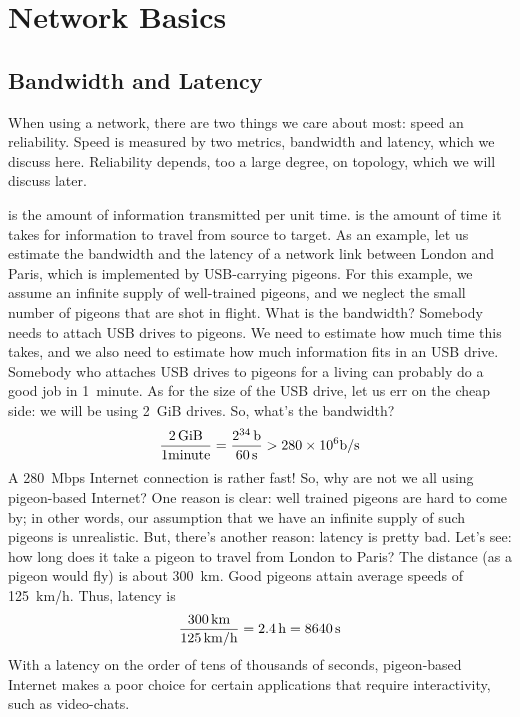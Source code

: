 \chapter{Network Basics}\label{ch:06-net-use}

\section{Bandwidth and Latency}

When using a network, there are two things we care about most: speed an reliability.
Speed is measured by two metrics, bandwidth and latency, which we discuss here.
Reliability depends, too a large degree, on topology, which we will discuss later.

 is the amount of information transmitted per unit time.
 is the amount of time it takes for information to travel
  from source to target.
As an example,
  let us estimate the bandwidth and the latency
  of a network link between London and Paris,
  which is implemented by USB-carrying pigeons.
For this example,
  we assume an infinite supply of well-trained pigeons,
  and we neglect the small number of pigeons that are shot in flight.
What is the bandwidth?
Somebody needs to attach USB drives to pigeons.
We need to estimate how much time this takes,
  and we also need to estimate how much information fits in an USB drive.
Somebody who attaches USB drives to pigeons for a living
  can probably do a good job in 1~minute.
As for the size of the USB drive,
  let us err on the cheap side: we will be using 2~GiB drives.
So, what's the bandwidth?
\[
\frac{2\,{\rm GiB}}{1\.{\rm minute}}
  = \frac{2^{34}\,{\rm b}}{60\,{\rm s}}
  > 280\times 10^6 {\rm b}/{\rm s}
\]
A 280~Mbps Internet connection is rather fast!
So, why are not we all using pigeon-based Internet?
One reason is clear: well trained pigeons are hard to come by;
  in other words,
  our assumption that we have an infinite supply of such pigeons is unrealistic.
But, there's another reason: latency is pretty bad.
Let's see: how long does it take a pigeon to travel from London to Paris?
The distance (as a pigeon would fly) is about 300~km.
Good pigeons attain average speeds of 125~km/h.
Thus, latency is
\[
\frac{300\,{\rm km}}{125\,{\rm km}/{\rm h}}
  = 2.4\,{\rm h} = 8640\,{\rm s}
\]
With a latency on the order of tens of thousands of seconds,
  pigeon-based Internet makes a poor choice for certain applications
  that require interactivity, such as video-chats.

